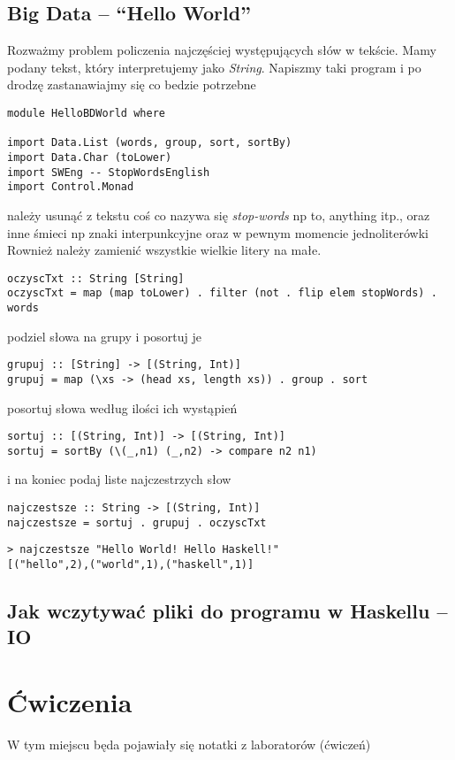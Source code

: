 \documentclass[11pt,a4paper]{article}
\begin{document}
\subsection{Big Data -- ``Hello World''}
Rozważmy problem policzenia najczęściej występujących słów w tekście. Mamy podany tekst, który interpretujemy jako \textit{String}. Napiszmy taki program i po drodzę zastanawiajmy się co bedzie potrzebne
\begin{Verbatim}[frame=single]
module HelloBDWorld where

import Data.List (words, group, sort, sortBy)
import Data.Char (toLower)
import SWEng -- StopWordsEnglish
import Control.Monad
\end{Verbatim}
należy usunąć z tekstu coś co nazywa się \textit{stop-words} np to, anything itp., oraz inne śmieci np znaki interpunkcyjne oraz w pewnym momencie jednoliterówki\\
Rownież należy zamienić wszystkie wielkie litery na małe.
\begin{Verbatim}[frame=single]
oczyscTxt :: String [String]
oczyscTxt = map (map toLower) . filter (not . flip elem stopWords) . words
\end{Verbatim}
podziel słowa na grupy i posortuj je
\begin{Verbatim}[frame=single]
grupuj :: [String] -> [(String, Int)]
grupuj = map (\xs -> (head xs, length xs)) . group . sort
\end{Verbatim}
posortuj słowa według ilości ich wystąpień
\begin{Verbatim}[frame=single]
sortuj :: [(String, Int)] -> [(String, Int)]
sortuj = sortBy (\(_,n1) (_,n2) -> compare n2 n1)
\end{Verbatim}
i na koniec podaj liste najczestrzych słow
\begin{Verbatim}[frame=single]
najczestsze :: String -> [(String, Int)]
najczestsze = sortuj . grupuj . oczyscTxt
\end{Verbatim}
\begin{Verbatim}[frame=single]
> najczestsze "Hello World! Hello Haskell!"
[("hello",2),("world",1),("haskell",1)]
\end{Verbatim}

\subsection{Jak wczytywać pliki do programu w Haskellu -- IO}


\section{Ćwiczenia}
W tym miejscu będa pojawiały się notatki z laboratorów (ćwiczeń)
\end{document}
